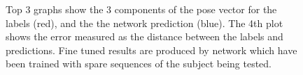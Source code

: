 \documentclass[11pt]{article} %
\begin{document}
\begin{figure}
\qquad
{}%
\qquad
{}%
\qquad
{}%
\caption{Top 3 graphs show the 3 components of the pose vector for the labels (red), and the the network prediction (blue). The 4th plot shows the error measured as the distance between the labels and predictions. Fine tuned results are produced by network which have been trained with spare sequences of the subject being tested. }
\label{fig:s1-6}
\end{figure}
\end{document}
